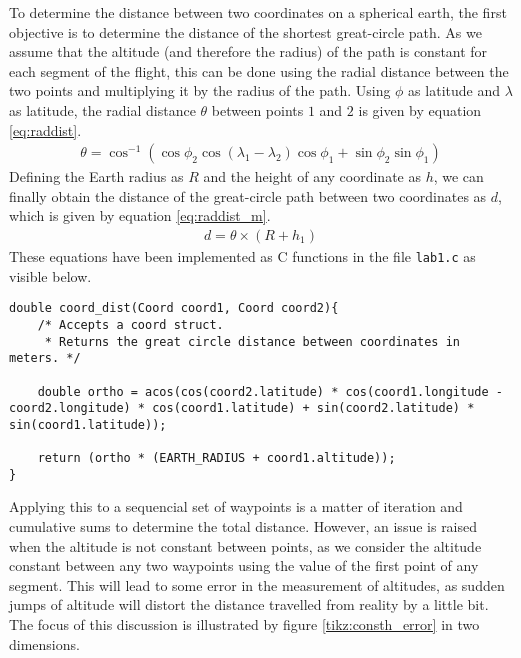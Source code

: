 \documentclass{article}
\begin{document}
To determine the distance between two coordinates on a spherical earth, the first objective is to determine the distance of the shortest great-circle path. As we assume that the altitude (and therefore the radius) of the path is constant for each segment of the flight, this can be done using the radial distance between the two points and multiplying it by the radius of the path. Using $\phi$ as latitude and $\lambda$ as latitude, the radial distance $\theta$ between points $1$ and $2$ is given by equation \ref{eq:raddist}.
\begin{gather} \label{eq:raddist}
    \theta = \cos^{-1}{\left(\cos\phi_2\cos\left(\lambda_1 - \lambda_2\right)\cos\phi_1 + \sin\phi_2\sin\phi_1\right)}
\end{gather}
Defining the Earth radius as $R$ and the height of any coordinate as $h$, we can finally obtain the distance of the great-circle path between two coordinates as $d$, which is given by equation \ref{eq:raddist_m}.
\begin{gather} \label{eq:raddist_m}
    d = \theta \times (R + h_1)
\end{gather}
These equations have been implemented as C functions in the file \texttt{lab1.c} as visible below.
\begin{verbatim}
double coord_dist(Coord coord1, Coord coord2){
    /* Accepts a coord struct.
     * Returns the great circle distance between coordinates in meters. */
    
    double ortho = acos(cos(coord2.latitude) * cos(coord1.longitude - coord2.longitude) * cos(coord1.latitude) + sin(coord2.latitude) * sin(coord1.latitude));
    
    return (ortho * (EARTH_RADIUS + coord1.altitude));
}
\end{verbatim}
Applying this to a sequencial set of waypoints is a matter of iteration and cumulative sums to determine the total distance. However, an issue is raised when the altitude is not constant between points, as we consider the altitude constant between any two waypoints using the value of the first point of any segment. This will lead to some error in the measurement of altitudes, as sudden jumps of altitude will distort the distance travelled from reality by a little bit. The focus of this discussion is illustrated by figure \ref{tikz:consth_error} in two dimensions.
\end{document}
